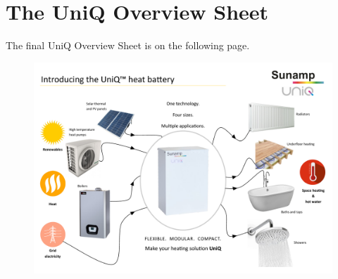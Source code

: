 
\chapter{The UniQ Overview Sheet} %

\label{AppendixA} %


%

The final UniQ Overview Sheet is on the following page.

%


\begin{figure}
    \centering
	\includegraphics[width=\textwidth]{Appendices/PIS_Overview.pdf}
\end{figure}